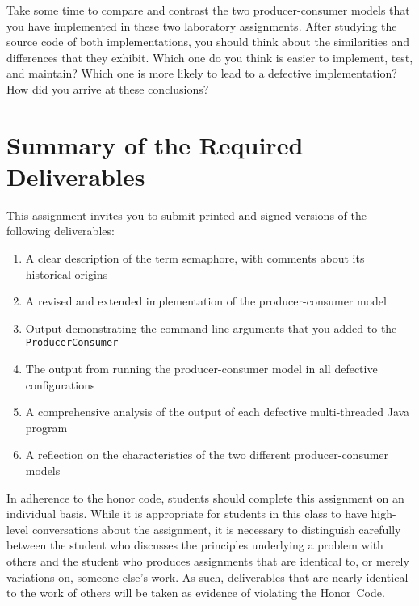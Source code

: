 Take some time to compare and contrast the two producer-consumer models that you have implemented in these two
laboratory assignments. After studying the source code of both implementations, you should think about the similarities
and differences that they exhibit.  Which one do you think is easier to implement, test, and maintain? Which one is more
likely to lead to a defective implementation? How did you arrive at these conclusions?

\section*{Summary of the Required Deliverables}

This assignment invites you to submit printed and signed versions of the following deliverables: 

\begin{enumerate}

  \item A clear description of the term semaphore, with comments about its historical origins 

  \item A revised and extended implementation of the producer-consumer model

  \item Output demonstrating the command-line arguments that you added to the {\tt ProducerConsumer}

  \item The output from running the producer-consumer model in all defective configurations

  \item A comprehensive analysis of the output of each defective multi-threaded Java program

  \item A reflection on the characteristics of the two different producer-consumer models

\end{enumerate}

In adherence to the honor code, students should complete this assignment on an individual basis. While it is appropriate
for students in this class to have high-level conversations about the assignment, it is necessary to distinguish
carefully between the student who discusses the principles underlying a problem with others and the student who produces
assignments that are identical to, or merely variations on, someone else's work.  As such, deliverables that are nearly
identical to the work of others will be taken as evidence of violating the \mbox{Honor Code}.  



  
